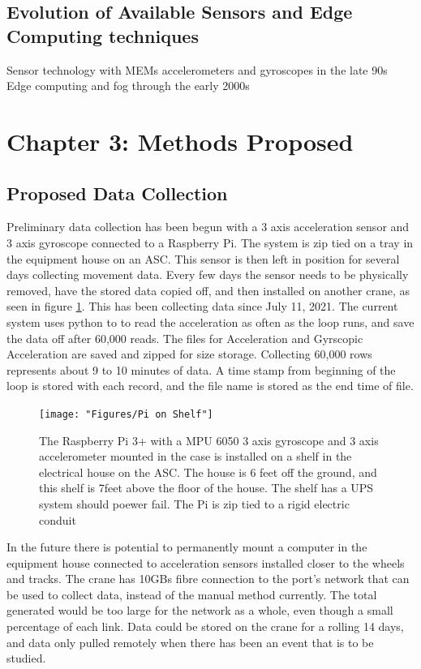 \documentclass[journal=jacsat,manuscript=article]{achemso}
\begin{document}
\subsection{Evolution of Available Sensors and Edge Computing techniques}
Sensor technology with MEMs accelerometers and gyroscopes in the late 90s Edge computing and fog through the early 2000s


\pagebreak
\section{Chapter 3: Methods Proposed}
\subsection{Proposed Data Collection}

Preliminary data collection has been begun with a 3 axis acceleration sensor and 3 axis gyroscope connected to a Raspberry Pi.  The system is zip tied on a tray in the equipment house on an ASC.  This sensor is then left in position for several days collecting movement data.  Every few days the sensor needs to be physically removed, have the stored data copied off, and then installed on another crane, as seen in figure \ref{fig:mounted_pi}.  This has been collecting data since July 11, 2021.  The current system uses python to to read the acceleration as often as the loop runs, and save the data off after 60,000 reads.  The files for Acceleration and Gyrscopic Acceleration are saved and zipped for size storage.  Collecting 60,000 rows represents about 9 to 10 minutes of data.  A time stamp from beginning of the loop is stored with each record, and the file name is stored as the end time of file.  

\begin{figure}
	\centering
	\texttt{[image: "Figures/Pi on Shelf"]}
	\caption[Sensor on a Shelf in the ASC House]{The Raspberry Pi 3+ with a MPU 6050 3 axis gyroscope and 3 axis accelerometer mounted in the case is installed on a shelf in the electrical house on the ASC.  The house is 6 feet off the ground, and this shelf is 7feet above the floor of the house.  The shelf has a UPS system should poewer fail.  The Pi is zip tied to a rigid electric conduit}
	\label{fig:mounted_pi}
\end{figure}

In the future there is potential to permanently mount a computer in the equipment house connected to acceleration sensors installed closer to the wheels and tracks.  The crane has 10GBs fibre connection to the port’s network that can be used to collect data, instead of the manual method currently.  The total generated would be too large for the network as a whole, even though a small percentage of each link.  Data could be stored on the crane for a rolling 14 days, and data only pulled remotely when there has been an event that is to be studied.
\end{document}
